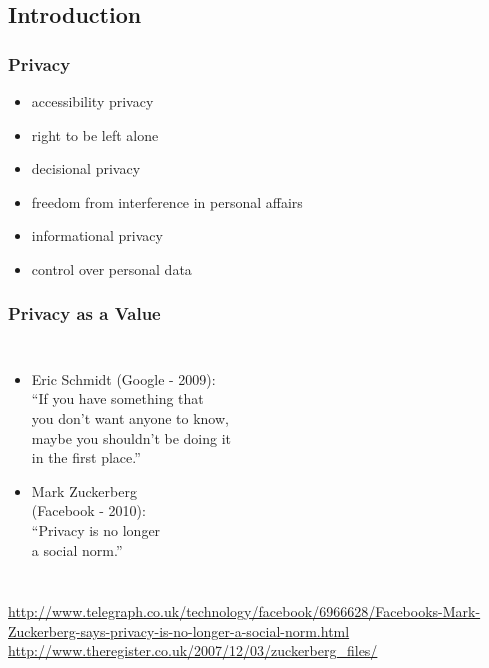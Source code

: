 \documentclass[dvipsnames]{beamer}
\theoremstyle{definition}
\theoremstyle{example}
\theoremstyle{plain}
\begin{document}
\subsection{Introduction}

\begin{frame}
  \frametitle{Privacy}

  \begin{itemize}
    \item accessibility privacy
    \item right to be left alone

    \pause
    \bigskip
    \item decisional privacy
    \item freedom from interference in personal affairs

    \pause
    \bigskip
    \item informational privacy
    \item control over personal data
  \end{itemize}
\end{frame}

\begin{frame}
  \frametitle{Privacy as a Value}

  \begin{columns}

    \begin{itemize}
      \item Eric Schmidt (Google - 2009):\\
        \smallskip
        ``If you have something that\\
          you don't want anyone to know,\\
          maybe you shouldn't be doing it\\
          in the first place.''

      \pause
      \medskip
      \item Mark Zuckerberg\\
        (Facebook - 2010):\\
        \smallskip
        ``Privacy is no longer\\
          a social norm.''
    \end{itemize}
  \end{columns}

  \medskip
  \tiny{\url{http://www.telegraph.co.uk/technology/facebook/6966628/Facebooks-Mark-Zuckerberg-says-privacy-is-no-longer-a-social-norm.html}}\\
  \tiny{\url{http://www.theregister.co.uk/2007/12/03/zuckerberg_files/}}\\
\end{frame}
\end{document}
